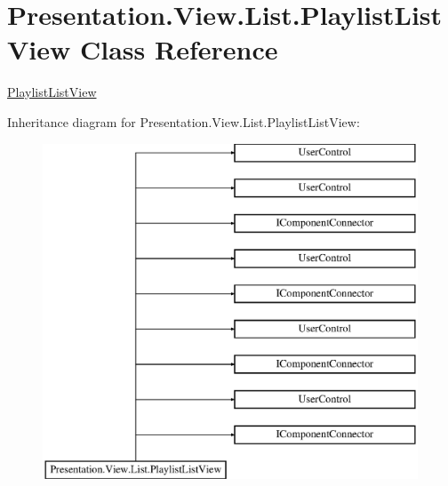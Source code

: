 \hypertarget{class_presentation_1_1_view_1_1_list_1_1_playlist_list_view}{}\section{Presentation.\+View.\+List.\+Playlist\+List\+View Class Reference}
\label{class_presentation_1_1_view_1_1_list_1_1_playlist_list_view}


\hyperlink{class_presentation_1_1_view_1_1_list_1_1_playlist_list_view}{Playlist\+List\+View}  


Inheritance diagram for Presentation.\+View.\+List.\+Playlist\+List\+View\+:\begin{figure}[H]
\begin{center}
\leavevmode
\includegraphics[height=10.000000cm]{class_presentation_1_1_view_1_1_list_1_1_playlist_list_view}
\end{center}
\end{figure}
